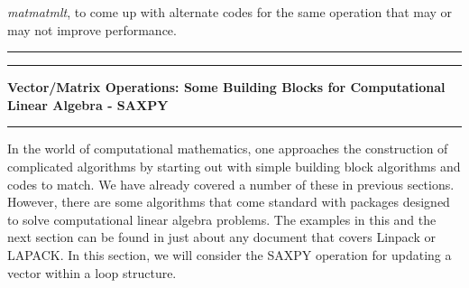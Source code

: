 \documentclass[10pt,fleqn]{article}
\begin{document}
{\it matmatmlt}, to come up with alternate codes for the same operation that
may or may not improve performance.
\vskip0.1in\hrule\vskip0.1in
\newpage
\vskip0.1in\hrule\vskip0.1in
\noindent
{\bf Vector/Matrix Operations: Some Building Blocks for Computational Linear
Algebra - SAXPY}
\vskip0.1in\hrule\vskip0.1in
\noindent
In the world of computational mathematics, one approaches the construction of
complicated algorithms by starting out with simple building block algorithms and
codes to match. We have already covered a number of these in previous sections.
However, there are some algorithms that come standard with packages designed to
solve computational linear algebra problems. The examples in this and the next
section can be found in just about any document that covers Linpack or LAPACK.
In this section, we will consider the SAXPY operation for updating
a vector within a loop structure.
\end{document}
